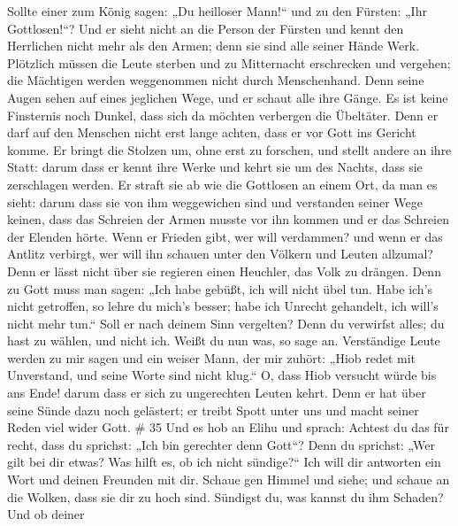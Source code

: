  Sollte einer zum König sagen: „Du heilloser Mann!{}`` und
zu den Fürsten: „Ihr Gottlosen!{}``?  Und er sieht nicht an
die Person der Fürsten und kennt den Herrlichen nicht mehr als den
Armen; denn sie sind alle seiner Hände Werk.  Plötzlich
müssen die Leute sterben und zu Mitternacht erschrecken und vergehen;
die Mächtigen werden weggenommen nicht durch Menschenhand. 
Denn seine Augen sehen auf eines jeglichen Wege, und er schaut alle ihre
Gänge.  Es ist keine Finsternis noch Dunkel, dass sich da
möchten verbergen die Übeltäter.  Denn er darf auf den
Menschen nicht erst lange achten, dass er vor Gott ins Gericht komme.
 Er bringt die Stolzen um, ohne erst zu forschen, und
stellt andere an ihre Statt:  darum dass er kennt ihre
Werke und kehrt sie um des Nachts, dass sie zerschlagen werden.
 Er straft sie ab wie die Gottlosen an einem Ort, da man es
sieht:  darum dass sie von ihm weggewichen sind und
verstanden seiner Wege keinen,  dass das Schreien der Armen
musste vor ihn kommen und er das Schreien der Elenden hörte.
 Wenn er Frieden gibt, wer will verdammen? und wenn er das
Antlitz verbirgt, wer will ihn schauen unter den Völkern und Leuten
allzumal?  Denn er lässt nicht über sie regieren einen
Heuchler, das Volk zu drängen.  Denn zu Gott muss man
sagen: „Ich habe gebüßt, ich will nicht übel tun.  Habe
ich's nicht getroffen, so lehre du mich's besser; habe ich Unrecht
gehandelt, ich will's nicht mehr tun.``  Soll er nach
deinem Sinn vergelten? Denn du verwirfst alles; du hast zu wählen, und
nicht ich. Weißt du nun was, so sage an.  Verständige Leute
werden zu mir sagen und ein weiser Mann, der mir zuhört: 
„Hiob redet mit Unverstand, und seine Worte sind nicht klug.``
 O, dass Hiob versucht würde bis ans Ende! darum dass er
sich zu ungerechten Leuten kehrt.  Denn er hat über seine
Sünde dazu noch gelästert; er treibt Spott unter uns und macht seiner
Reden viel wider Gott. \# 35  Und es hob an Elihu und
sprach:  Achtest du das für recht, dass du sprichst: „Ich
bin gerechter denn Gott``?  Denn du sprichst: „Wer gilt bei
dir etwas? Was hilft es, ob ich nicht sündige?{}``  Ich will
dir antworten ein Wort und deinen Freunden mit dir.  Schaue
gen Himmel und siehe; und schaue an die Wolken, dass sie dir zu hoch
sind.  Sündigst du, was kannst du ihm Schaden? Und ob deiner
